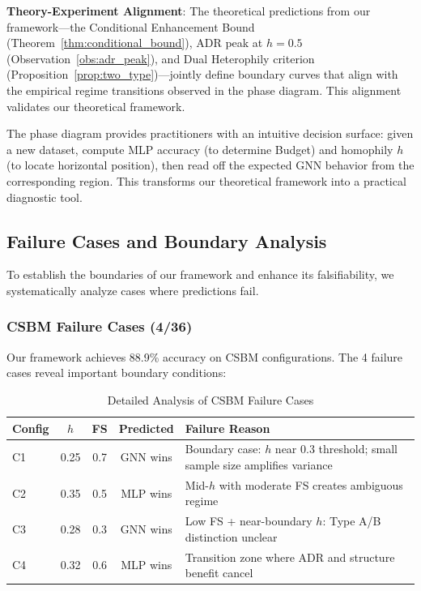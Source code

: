 \textbf{Theory-Experiment Alignment}: The theoretical predictions from our framework---the Conditional Enhancement Bound (Theorem~\ref{thm:conditional_bound}), ADR peak at $h=0.5$ (Observation~\ref{obs:adr_peak}), and Dual Heterophily criterion (Proposition~\ref{prop:two_type})---jointly define boundary curves that align with the empirical regime transitions observed in the phase diagram. This alignment validates our theoretical framework.

\begin{remark}
The phase diagram provides practitioners with an intuitive decision surface: given a new dataset, compute MLP accuracy (to determine Budget) and homophily $h$ (to locate horizontal position), then read off the expected GNN behavior from the corresponding region. This transforms our theoretical framework into a practical diagnostic tool.
\end{remark}

\subsection{Failure Cases and Boundary Analysis}
\label{sec:failure_analysis}

To establish the boundaries of our framework and enhance its falsifiability, we systematically analyze cases where predictions fail.

\subsubsection{CSBM Failure Cases (4/36)}

Our framework achieves 88.9\% accuracy on CSBM configurations. The 4 failure cases reveal important boundary conditions:

\begin{table}[t]
\centering
\caption{Detailed Analysis of CSBM Failure Cases}
\label{tab:failure_cases}
\small
\begin{tabular}{@{}lcccp{4cm}@{}}
\toprule
\textbf{Config} & \textbf{$h$} & \textbf{FS} & \textbf{Predicted} & \textbf{Failure Reason} \\
\midrule
C1 & 0.25 & 0.7 & GNN wins & Boundary case: $h$ near 0.3 threshold; small sample size amplifies variance \\
C2 & 0.35 & 0.5 & MLP wins & Mid-$h$ with moderate FS creates ambiguous regime \\
C3 & 0.28 & 0.3 & GNN wins & Low FS + near-boundary $h$: Type A/B distinction unclear \\
C4 & 0.32 & 0.6 & MLP wins & Transition zone where ADR and structure benefit cancel \\
\bottomrule
\end{tabular}
\end{table}

